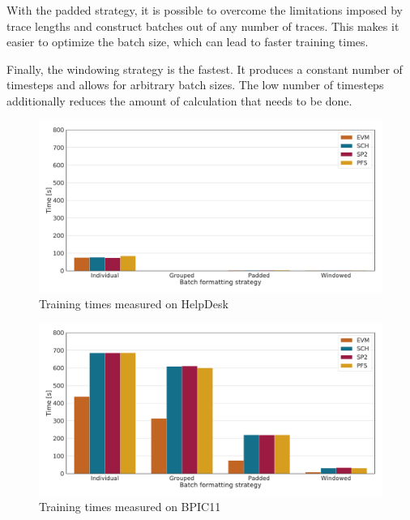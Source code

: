 With the padded strategy, it is possible to overcome the limitations imposed by trace lengths and construct batches out of any number of traces. This makes it easier to optimize the batch size, which can lead to faster training times.

Finally, the windowing strategy is the fastest.
It produces a constant number of timesteps and allows for arbitrary batch sizes.
The low number of timesteps additionally reduces the amount of calculation that needs to be done.

\begin{figure}
    \centering
    \includegraphics[width=\textwidth]{gfx/helpdesk/train_timings.pdf}
    \caption{Training times measured on HelpDesk}
    \label{fig:helpdesk-training-timings}
\end{figure}
\begin{figure}
    \centering
    \includegraphics[width=\textwidth]{gfx/bpic2011/train_timings.pdf}
    \caption{Training times measured on BPIC11}
    \label{fig:BPIC11-training-timings}
\end{figure}

